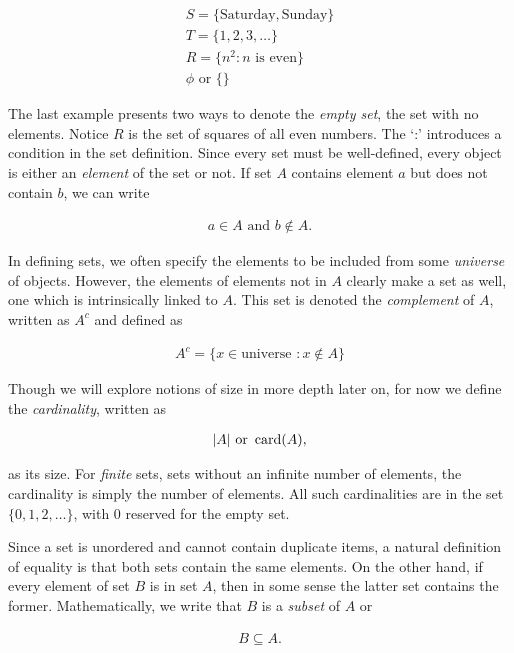 \begin{align*}
	S = \{\text{Saturday}, \text{Sunday}\} \\
	T = \{1, 2, 3, \dots \} \\
	R = \{n^2 : n \text{ is even} \} \\
	\phi \text{ or } \{ \}
\end{align*}

The last example presents two ways to denote the \emph{empty set}, the set with no elements. Notice $R$ is the set of squares of all even numbers. The `:' introduces a condition in the set definition. Since every set must be well-defined, every object is either an \emph{element} of the set or not. If set $A$ contains element $a$ but does not contain $b$, we can write

\begin{align*}
	a \in A \text{ and } b \notin A.
\end{align*}

In defining sets, we often specify the elements to be included from some \emph{universe} of objects. However, the elements of elements not in $A$ clearly make a set as well, one which is intrinsically linked to $A$. This set is denoted the \emph{complement} of $A$, written as $A^c$ and defined as

\begin{align*}
	A^c = \{ x \in \text{universe } : x \notin A \}
\end{align*}

Though we will explore notions of size in more depth later on, for now we define the \emph{cardinality}, written as 

\begin{align*}
	|A| \text{ or } \operatorname{card}(A),
\end{align*}

as its size. For \emph{finite} sets, sets without an infinite number of elements, the cardinality is simply the number of elements. All such cardinalities are in the set $\{0, 1, 2, \dots\}$, with 0 reserved for the empty set.

Since a set is unordered and cannot contain duplicate items, a natural definition of equality is that both sets contain the same elements. On the other hand, if every element of set $B$ is in set $A$, then in some sense the latter set contains the former. Mathematically, we write that $B$ is a \emph{subset} of $A$ or

\begin{align*}
	B \subseteq A.
\end{align*}

